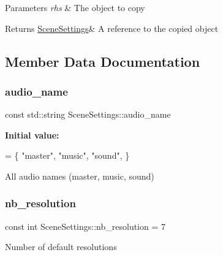 \begin{DoxyParams}{Parameters}
{\em rhs} & The object to copy \\
\hline
\end{DoxyParams}
\begin{DoxyReturn}{Returns}
\hyperlink{class_scene_settings}{Scene\+Settings}\& A reference to the copied object 
\end{DoxyReturn}


\subsection{Member Data Documentation}
\mbox{\label{class_scene_settings_a06afc9f52a21fc03e3b6823bcecefdd3}} 
\subsubsection{\texorpdfstring{audio\+\_\+name}{audio\_name}}
{\footnotesize\ttfamily const std\+::string Scene\+Settings\+::audio\+\_\+name\hspace{0.3cm}{\ttfamily [static]}}

{\bfseries Initial value\+:}
\begin{DoxyCode}
= \{
    \textcolor{stringliteral}{"master"},
    \textcolor{stringliteral}{"music"},
    \textcolor{stringliteral}{"sound"},
\}
\end{DoxyCode}
All audio names (master, music, sound) \mbox{\label{class_scene_settings_a1562222a4d6383d813923504a0818807}} 
\subsubsection{\texorpdfstring{nb\+\_\+resolution}{nb\_resolution}}
{\footnotesize\ttfamily const int Scene\+Settings\+::nb\+\_\+resolution = 7\hspace{0.3cm}{\ttfamily [static]}}

Number of default resolutions \mbox{\label{class_scene_settings_a2a438f29929e98bc99953b5afc879602}} 
